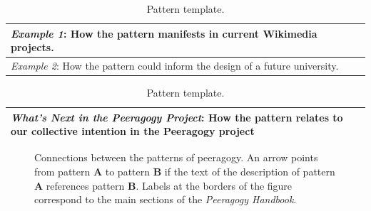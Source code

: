 \begin{refsection}
\begin{table}
{\begin{tabular}{|p{}|}
\hline
\emph{Example 1}: How the pattern manifests in current Wikimedia projects.\\ \hline
\emph{Example 2}: How the pattern could inform the design of a future university.\\ \hline
\end{tabular}
\vspace{.1cm}

\begin{tabular}{|p{}|}
\hline
\emph{What's Next in the Peeragogy Project}: How the pattern relates to our collective intention in the Peeragogy project\\ \hline
\end{tabular}

\par}
\vspace{-.1cm}
\caption{Pattern template.\label{tab:pattern-template}}
\vspace{-.9cm}
\end{table}

\FloatBarrier

\begin{figure}
{\centering


\par
}

\caption{Connections between the patterns of peeragogy.  An arrow points from pattern \textbf{A} to pattern \textbf{B} if the text of the description of pattern \textbf{A} references pattern \textbf{B}.  Labels at the borders of the figure correspond to the main sections of the \emph{Peeragogy Handbook}.\label{fig:connections}}
\end{figure}

\FloatBarrier


\end{refsection}
